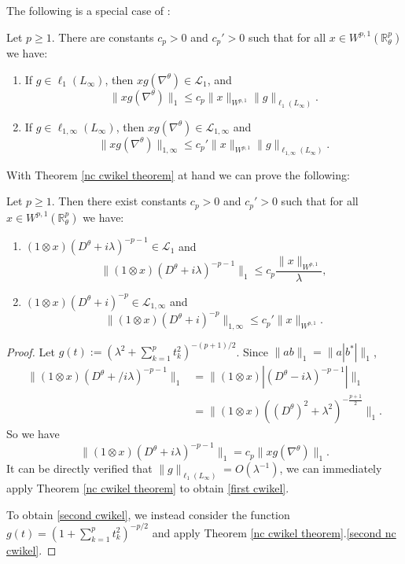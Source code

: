     The following is a special case of \cite[Theorem 7.6, Theorem 7.7]{LeSZ-cwikel}:    
    \begin{thm}\label{nc cwikel theorem}
        Let $p \geq 1$. There are constants $c_p > 0$ and $c_p' > 0$ such that for all $x \in W^{p,1}(\mathbb{R}^p_\theta)$ we have:
        \begin{enumerate}[{\rm (a)}]
            \item{}\label{first nc cwikel} If $g \in \ell_1(L_\infty)$, then $xg(\nabla^\theta) \in \mathcal{L}_1$, and $$\|xg(\nabla^\theta)\|_1 \leq c_p\|x\|_{W^{p,1}}\|g\|_{\ell_1(L_\infty)}.$$
            \item{}\label{second nc cwikel} If $g \in \ell_{1,\infty}(L_\infty)$, then $xg(\nabla^\theta) \in \mathcal{L}_{1,\infty}$ and $$\|xg(\nabla^\theta)\|_{1,\infty} \leq c_p'\|x\|_{W^{p,1}}\|g\|_{\ell_{1,\infty}(L_\infty)}.$$
        \end{enumerate}
    \end{thm}
    
    With Theorem \ref{nc cwikel theorem} at hand we can prove the following:
    \begin{thm}\label{nc dirac cwikel}
        Let $p\geq 1$. Then there exist constants $c_p > 0$ and $c_p' > 0$ such that for all $x \in W^{p,1}(\mathbb{R}^p_\theta)$ we have:
        \begin{enumerate}[{\rm (a)}]
            \item{}\label{first cwikel} $(1\otimes x)(D^\theta+i\lambda)^{-p-1} \in \mathcal{L}_1$ and $$\|(1\otimes x)(D^\theta+i\lambda)^{-p-1}\|_1 \leq c_p\frac{\|x\|_{W^{p,1}}}{\lambda},$$
            \item{}\label{second cwikel} $(1\otimes x)(D^\theta+i)^{-p} \in \mathcal{L}_{1,\infty}$ and $$\|(1\otimes x)(D^\theta+i)^{-p}\|_{1,\infty} \leq c_p'\|x\|_{W^{p,1}}.$$
        \end{enumerate}
    \end{thm}
    \begin{proof}
        Let $g(t) := (\lambda^2+\sum_{k=1}^p t_k^2)^{-(p+1)/2}$. Since $\|ab\|_1 = \|a|b^*|\|_1$,
        \begin{align*}
            \|(1\otimes x)(D^\theta + /i\lambda)^{-p-1}\|_1 &= \|(1\otimes x)|(D^\theta-i\lambda)^{-p-1}|\|_1\\
                                                          &= \|(1\otimes x)((D^\theta)^2+\lambda^2)^{-\frac{p+1}{2}}\|_1.
        \end{align*}
        So we have
        \begin{equation*}
            \|(1\otimes x)(D^\theta+i\lambda)^{-p-1}\|_1 = c_p\|xg(\nabla^\theta)\|_1.
        \end{equation*}
        It can be directly verified that $\|g\|_{\ell_1(L_\infty)} = O(\lambda^{-1})$, we can immediately apply Theorem \ref{nc cwikel theorem} to obtain \eqref{first cwikel}.
        
        To obtain \eqref{second cwikel}, we instead consider the function $g(t) = (1+\sum_{k=1}^p t_k^2)^{-p/2}$ and apply Theorem \ref{nc cwikel theorem}.\eqref{second nc cwikel}.
    \end{proof}
    

